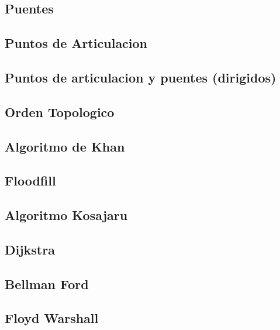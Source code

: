 \subsection{Puentes}
\raggedbottom
\hrulefill
\subsection{Puntos de Articulacion}
\raggedbottom
\hrulefill
\subsection{Puntos de articulacion y puentes (dirigidos)}
\raggedbottom
\hrulefill
\subsection{Orden Topologico}
\raggedbottom
\hrulefill
\subsection{Algoritmo de Khan}
\raggedbottom
\hrulefill
\subsection{Floodfill}
\raggedbottom
\hrulefill
\subsection{Algoritmo Kosajaru}
\raggedbottom
\hrulefill
\subsection{Dijkstra}
\raggedbottom
\hrulefill
\subsection{Bellman Ford}
\raggedbottom
\hrulefill
\subsection{Floyd Warshall}
\raggedbottom
\hrulefill

